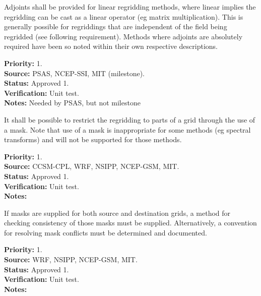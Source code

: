 
Adjoints shall be provided for linear regridding methods, where linear
implies the regridding can be cast as a linear operator (eg matrix 
multiplication). This is generally possible for regriddings that are 
independent of the field being regridded (see following requirement).
Methods where adjoints are absolutely required have been so noted within 
their own respective descriptions.

\begin{reqlist}
{\bf Priority:} 1. \\
{\bf Source:} PSAS, NCEP-SSI, MIT (milestone).\\
{\bf Status:} Approved 1. \\
{\bf Verification:} Unit test. \\
{\bf Notes:} Needed by PSAS, but not milestone
\end{reqlist}


It shall be possible to restrict the regridding to parts of a grid through 
the use of a mask.  Note that use of a mask is inappropriate for some methods 
(eg spectral transforms) and will not be supported for those methods.

\begin{reqlist}
{\bf Priority:} 1. \\
{\bf Source:} CCSM-CPL, WRF, NSIPP, NCEP-GSM, MIT. \\
{\bf Status:} Approved 1. \\
{\bf Verification:} Unit test. \\
{\bf Notes:} 
\end{reqlist}


If masks are supplied for both source and destination grids, a
method for checking consistency of those masks must be supplied.
Alternatively, a convention for resolving mask conflicts must
be determined and documented.

\begin{reqlist}
{\bf Priority:} 1. \\
{\bf Source:} WRF, NSIPP, NCEP-GSM, MIT. \\
{\bf Status:} Approved 1. \\
{\bf Verification:} Unit test. \\
{\bf Notes:} 
\end{reqlist}

